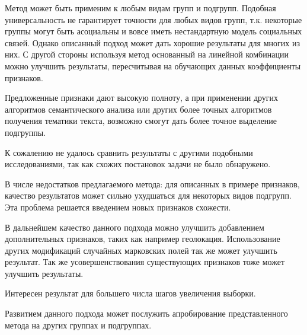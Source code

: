\documentclass[annotation,times,page4]{itmo-student-thesis}
\begin{document}
Метод может быть применим к любым видам групп и подгрупп. Подобная универсальность не гарантирует точности для любых видов групп, т.к. некоторые группы могут быть асоциальны и вовсе иметь нестандартную модель социальных связей. Однако описанный подход может дать хорошие результаты для многих из них. С другой стороны используя метод основанный на линейной комбинации можно улучшить результаты, пересчитывая на обучающих данных коэффициенты признаков. 

Предложенные признаки дают высокую полноту, а при применении других алгоритмов семантического анализа или других более точных алгоритмов получения тематики текста, возможно смогут дать более точное выделение подгруппы.

К сожалению не удалось сравнить результаты с другими подобными исследованиями, так как схожих постановок задачи не было обнаружено.

В числе недостатков предлагаемого метода: для описанных в примере признаков, качество результатов может сильно ухудшаться для некоторых видов подгрупп. Эта проблема решается введением новых признаков схожести.

В дальнейшем качество данного подхода можно улучшить добавлением дополнительных признаков, таких как например геолокация. Использование других модификаций случайных марковских полей так же может улучшить результат. Так же усовершенствования существующих признаков тоже может улучшить результаты.

Интересен результат для большего числа шагов увеличения выборки.

Развитием данного подхода может послужить апробирование представленного метода на других группах и подгруппах.

\printbibliography[heading=trueHeading]

\appendix
\end{document}
